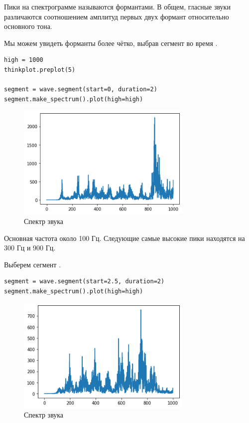 \documentclass[a4paper,12pt]{report}
\begin{document}
Пики на спектрограмме называются формантами. В общем, гласные звуки различаются соотношением амплитуд первых двух формант относительно основного тона.

Мы можем увидеть форманты более чётко, выбрав сегмент во время .

\begin{lstlisting}[caption=Спектр звука \textquote{a}]
high = 1000
thinkplot.preplot(5)

segment = wave.segment(start=0, duration=2)
segment.make_spectrum().plot(high=high)
\end{lstlisting}

\begin{figure}[H]
        \centering
        \includegraphics[width=0.75\textwidth]{lab3_fig6_2.png}
        \caption{Спектр звука }
        \label{fig:lab3_fig6_2}
\end{figure}

Основная частота около 100 Гц. Следующие самые высокие пики находятся на 300 Гц и 900 Гц.

Выберем сегмент .

\begin{lstlisting}[caption=Спектр звука \textquote{e}]
segment = wave.segment(start=2.5, duration=2)
segment.make_spectrum().plot(high=high)
\end{lstlisting}

\begin{figure}[H]
        \centering
        \includegraphics[width=0.75\textwidth]{lab3_fig6_3.png}
        \caption{Спектр звука }
        \label{fig:lab3_fig6_3}
\end{figure}
\end{document}
